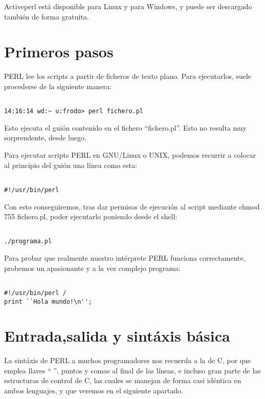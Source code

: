 Activeperl está disponible para Linux y para Windows, y puede ser descargado también de forma gratuita.

\section{Primeros pasos}

PERL lee los scripts a partir de ficheros de texto plano. Para ejecutarlos, suele procederse de la siguiente manera:

\begin{verbatim}

14:16:14 wd:~ u:frodo> perl fichero.pl

\end{verbatim}

Esto ejecuta el guión contenido en el fichero ``fichero.pl''. Esto no resulta muy sorprendente, desde luego.

Para ejecutar scripts PERL en GNU/Linux o UNIX, podemos recurrir a colocar al principio del guión una línea como esta:

\begin{verbatim}

#!/usr/bin/perl

\end{verbatim}

Con esto conseguiremos, tras dar permisos de ejecución al script mediante chmod 755 fichero.pl, poder ejecutarlo poniendo desde el shell:

\begin {verbatim}

./programa.pl

\end{verbatim}

Para probar que realmente nuestro intérprete PERL funciona correctamente, probemos un apasionante y a la vez complejo programa:

\begin {verbatim}

#!/usr/bin/perl / 
print ``Hola mundo!\n'';

\end{verbatim}

\section{Entrada,salida y sintáxis básica}

La sintáxis de PERL a muchos programadores nos recuerda a la de C, por que emplea llaves ``{ }'', puntos y comas al final de las líneas, e incluso gran parte
de las estructuras de control de C, las cuales se manejan de forma casi idéntica en ambos lenguajes, y que veremos en el siguiente apartado. 

